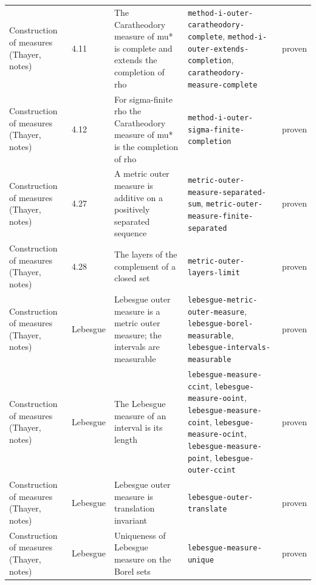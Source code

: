 \begin{longtable}{@{}ll>{\raggedright\arraybackslash}p{4.2cm}>{\raggedright\arraybackslash}p{4.2cm}l@{}}
Construction of measures (Thayer, notes) & 4.11 & The Caratheodory measure of mu* is complete and extends the completion of rho & \texttt{method-\allowbreak{}i-\allowbreak{}outer-\allowbreak{}caratheodory-\allowbreak{}complete}, \texttt{method-\allowbreak{}i-\allowbreak{}outer-\allowbreak{}extends-\allowbreak{}completion}, \texttt{caratheodory-\allowbreak{}measure-\allowbreak{}complete} & proven \\
Construction of measures (Thayer, notes) & 4.12 & For sigma-finite rho the Caratheodory measure of mu* is the completion of rho & \texttt{method-\allowbreak{}i-\allowbreak{}outer-\allowbreak{}sigma-\allowbreak{}finite-\allowbreak{}completion} & proven \\
Construction of measures (Thayer, notes) & 4.27 & A metric outer measure is additive on a positively separated sequence & \texttt{metric-\allowbreak{}outer-\allowbreak{}measure-\allowbreak{}separated-\allowbreak{}sum}, \texttt{metric-\allowbreak{}outer-\allowbreak{}measure-\allowbreak{}finite-\allowbreak{}separated} & proven \\
Construction of measures (Thayer, notes) & 4.28 & The layers of the complement of a closed set & \texttt{metric-\allowbreak{}outer-\allowbreak{}layers-\allowbreak{}limit} & proven \\
Construction of measures (Thayer, notes) & Lebesgue & Lebesgue outer measure is a metric outer measure; the intervals are measurable & \texttt{lebesgue-\allowbreak{}metric-\allowbreak{}outer-\allowbreak{}measure}, \texttt{lebesgue-\allowbreak{}borel-\allowbreak{}measurable}, \texttt{lebesgue-\allowbreak{}intervals-\allowbreak{}measurable} & proven \\
Construction of measures (Thayer, notes) & Lebesgue & The Lebesgue measure of an interval is its length & \texttt{lebesgue-\allowbreak{}measure-\allowbreak{}ccint}, \texttt{lebesgue-\allowbreak{}measure-\allowbreak{}ooint}, \texttt{lebesgue-\allowbreak{}measure-\allowbreak{}coint}, \texttt{lebesgue-\allowbreak{}measure-\allowbreak{}ocint}, \texttt{lebesgue-\allowbreak{}measure-\allowbreak{}point}, \texttt{lebesgue-\allowbreak{}outer-\allowbreak{}ccint} & proven \\
Construction of measures (Thayer, notes) & Lebesgue & Lebesgue outer measure is translation invariant & \texttt{lebesgue-\allowbreak{}outer-\allowbreak{}translate} & proven \\
Construction of measures (Thayer, notes) & Lebesgue & Uniqueness of Lebesgue measure on the Borel sets & \texttt{lebesgue-\allowbreak{}measure-\allowbreak{}unique} & proven \\

\end{longtable}

